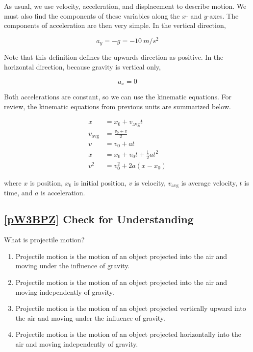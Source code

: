 \documentclass[main-physics.tex]{subfiles}
\begin{document}
As usual, we use velocity, acceleration, and displacement to describe motion. We must also find the components of these variables along the $x$- and $y$-axes. The components of acceleration are then very simple. In the vertical direction,

\begin{equation}
    a_y = -g = -\SI{10}{m/s^2}
\end{equation}

Note that this definition defines the upwards direction as positive. In the horizontal direction, because gravity is vertical only,

\begin{equation}
    a_x = 0
\end{equation}

Both accelerations are constant, so we can use the kinematic equations. For review, the kinematic equations from previous units are summarized below.

\begin{align}
    x &= x_0 + v_{\text{avg}} t\\[0.5ex]
    v_{\text{avg}} &= \frac{v_0 + v}{2}\\[0.5ex]
    v &= v_0 + a t\\[0.5ex]
    x &= x_0 + v_0 t + \frac{1}{2} a t^2\\[0.5ex]
    v^2 &= v_0^2 + 2 a (x - x_0)
\end{align}

where $x$ is position, $x_0$ is initial position, $v$ is velocity, $v_{\text{avg}}$ is average velocity, $t$ is time, and $a$ is acceleration.

\subsection*{\ref{pW3BPZ} Check for Understanding}

\begin{exercise} \label{nmtty2}
    What is projectile motion?
    
    \begin{enumerate}[label=\Alph*.]
        \item Projectile motion is the motion of an object projected into the air and moving under the influence of gravity.
        \item Projectile motion is the motion of an object projected into the air and moving independently of gravity.
        \item Projectile motion is the motion of an object projected vertically upward into the air and moving under the influence of gravity.
        \item Projectile motion is the motion of an object projected horizontally into the air and moving independently of gravity.
    \end{enumerate}
\end{exercise}
\end{document}
